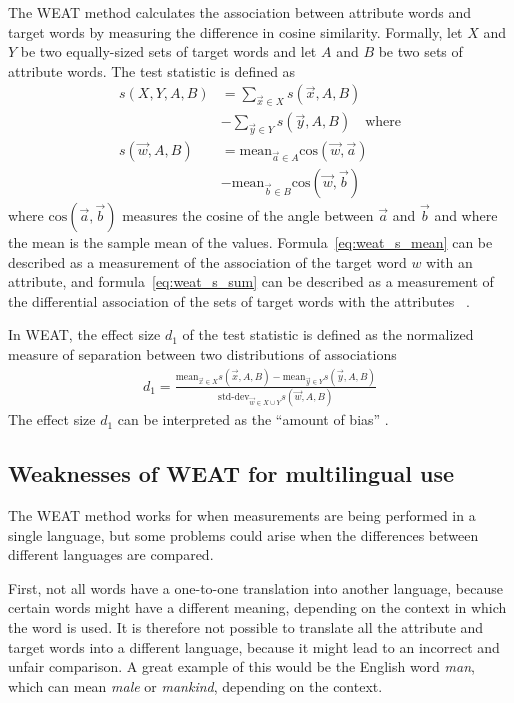 The WEAT method calculates the association between attribute words and target words
by measuring the difference in cosine similarity. Formally, 
let $X$ and $Y$ be two equally-sized sets of target words and let $A$ and $B$ be two
sets of attribute words. The test statistic is defined as
\begin{align} \label{eq:weat_s_sum}
    \textstyle s(X,Y,A,B) &= \displaystyle\sum_{\vec{x} \in X} s(\vec{x},A,B)\nonumber \\
                          &- \displaystyle\sum_{\vec{y} \in Y} s(\vec{y},A,B)\quad\text{where}\\
\label{eq:weat_s_mean}
    s(\vec{w},A,B) &= \text{mean}_{\vec{a} \in A} \text{cos}(\vec{w}, \vec{a})
            \nonumber\\
                   &- \text{mean}_{\vec{b} \in B} \text{cos}(\vec{w}, \vec{b})
\end{align}
where $\text{cos}(\overrightarrow{a}, \overrightarrow{b})$ measures the cosine of the angle
between $\vec{a}$ and $\vec{b}$ and where the mean is the sample mean of the values.
Formula~\eqref{eq:weat_s_mean} can be described as a measurement of the association of the
target word $w$ with
an attribute, and formula~\eqref{eq:weat_s_sum} can be described as a measurement of the
differential association of the sets of target words with the attributes~ 
\parencite{caliskan_2017_semantics_language_corpora}.

In WEAT, the effect size $d_1$ of the test statistic is defined as the normalized measure of separation
between two distributions of associations~\parencite{caliskan_2017_semantics_language_corpora}
\begin{align} \label{eq:weat_effect_size}
d_1 = \frac{
    \text{mean}_{\vec{x} \in X} s(\vec{x}, A, B) - \text{mean}_{\vec{y} \in Y} s(\vec{y}, A, B)
}{
\text{std-dev}_{\vec{w} \in X \cup Y} s(\vec{w},A,B)
}
\end{align}
The effect size $d_1$ can be interpreted as the ``amount of bias'' \parencite{lauscher-glavas-2019-consistently}.

\subsection{Weaknesses of WEAT for multilingual use}
The WEAT method works for when measurements are being performed in a single language, but
some problems could arise when the differences between different languages are
compared.

First, not all words have a one-to-one translation into another
language, because certain words might have a different meaning, depending on the
context in which the word is used. It is therefore not possible to translate all the
attribute and target words into a different language, because it might lead to an
incorrect and unfair comparison. A great example of this would be the English word
\textit{man}, which can mean \textit{male} or \textit{mankind}, depending on the context.

